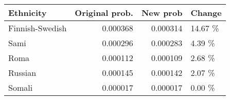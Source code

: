 \begin{tabular}{lrrl}
\toprule
      Ethnicity &  Original prob. &  New prob &  Change \\
\midrule
Finnish-Swedish &        0.000368 &  0.000314 & 14.67 \% \\
           Sami &        0.000296 &  0.000283 &  4.39 \% \\
           Roma &        0.000112 &  0.000109 &  2.68 \% \\
        Russian &        0.000145 &  0.000142 &  2.07 \% \\
         Somali &        0.000017 &  0.000017 &  0.00 \% \\
\bottomrule
\end{tabular}
